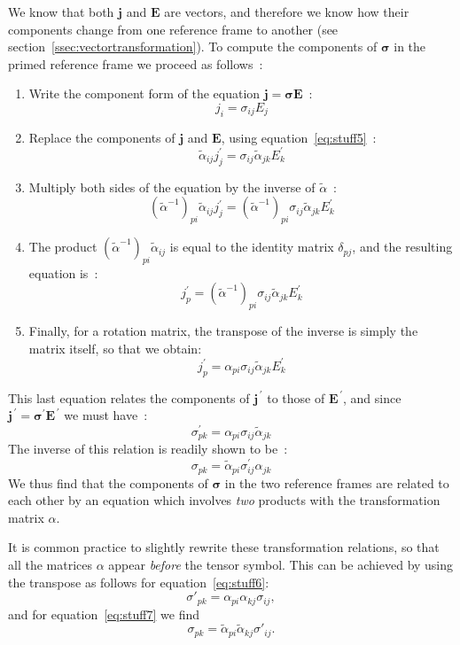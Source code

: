 We know that both $\mathbf{j}$ and $\mathbf{E}$ are vectors, and therefore we know how their components change from one reference frame to another (see section~\ref{ssec:vectortransformation}).  To compute the components of $\bm{\sigma}$ in the primed reference frame we proceed as follows~:
\begin{enumerate}
\item Write the component form of the equation $\mathbf{j}= 
\bm{\sigma}\mathbf{E}$~:
\[
j_i=\sigma_{ij}E_j
\]
\item Replace the components of $\mathbf{j}$ and $\mathbf{E}$, using 
equation~\ref{eq:stuff5}~:
\[
\tilde{\alpha}_{ij}j_j^{\prime}=\sigma_{ij}\tilde{\alpha}_{jk} 
E_k^{\prime}
\]
\item Multiply both sides of the equation by the inverse of 
$\tilde{\alpha}$~:
\[
\left(\tilde{\alpha}^{-1}\right)_{pi}\tilde{\alpha}_{ij} 
j_j^{\prime}=\left(\tilde{\alpha}^{-1}\right)_{pi} 
\sigma_{ij}\tilde{\alpha}_{jk} E_k^{\prime}
\]
\item The product $\left(\tilde{\alpha}^{-1}\right)_{pi} 
\tilde{\alpha}_{ij}$ is equal to the identity matrix $\delta_{pj}$, 
and the resulting equation is~:
\[
j_p^{\prime}=\left(\tilde{\alpha}^{-1}\right)_{pi} 
\sigma_{ij}\tilde{\alpha}_{jk} E_k^{\prime}
\]
\item Finally, for a rotation matrix, the transpose of the inverse is simply the matrix itself, so that we obtain:
\[
j_p^{\prime}=\alpha_{pi}\sigma_{ij}\tilde{\alpha}_{jk} E_k^{\prime}
\]
\end{enumerate}
This last equation relates the components of $\mathbf{j}^{\,\prime}$ to 
those of $\mathbf{E}^{\,\prime}$, and since $\mathbf{j}^{\,\prime}= 
\bm{\sigma}^{\prime}\mathbf{E}^{\,\prime}$ we must have~:
\begin{equation}
\sigma^{\prime}_{pk}= 
\alpha_{pi}\sigma_{ij}\widetilde{\alpha}_{jk}
\label{eq:stuff6}
\end{equation}
The inverse of this relation is readily shown to be~:
\begin{equation}
\sigma_{pk}= 
\widetilde{\alpha}_{pi}\sigma^{\prime}_{ij}\alpha_{jk}
\label{eq:stuff7}
\end{equation}
We thus find that the components of $\bm{\sigma}$ in the two 
reference frames are related to each other by an equation which 
involves \textit{two} products with the transformation matrix 
$\alpha$.

It is common practice to slightly rewrite these transformation relations,
so that all the matrices $\alpha$ appear \textit{before} the tensor symbol.
This can be achieved by using the transpose as follows for equation~\ref{eq:stuff6}:
\begin{equation}
	\sigma'_{pk} = \alpha_{pi}\alpha_{kj}\sigma_{ij},
\end{equation}
and for equation~\ref{eq:stuff7} we find
\begin{equation}
	\sigma_{pk} = \tilde{\alpha}_{pi}\tilde{\alpha}_{kj}\sigma'_{ij}.
\end{equation}


